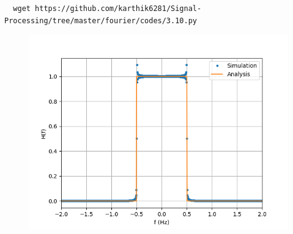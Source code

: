 \documentclass[journal,12pt,twocolumn]{IEEEtran}
\renewcommand\thesection{\arabic{section}}
\begin{document}
\begin{enumerate}[label=\thesection.\arabic*
,ref=\thesection.\theenumi]
\begin{lstlisting}
  wget https://github.com/karthik6281/Signal-Processing/tree/master/fourier/codes/3.10.py
\end{lstlisting}
\begin{figure}[!ht]
  \centering
  \includegraphics[width=\columnwidth]{./figs/3.10}
  \caption{}
\end{figure}
\end{enumerate}
\end{document}
